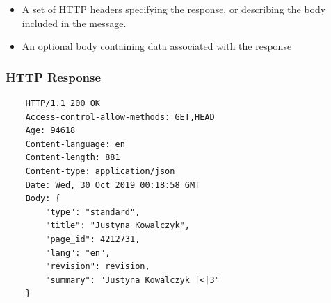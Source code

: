 \documentclass[aspectratio=169]{beamer}
\begin{document}
\begin{frame}
{\begin{itemize}
            \item A set of HTTP headers specifying the response, or describing the body included in the message.
            \item An optional body containing data associated with the response
        \end{itemize}
    }
\end{frame}

\begin{frame}[fragile]
    \frametitle{HTTP Response}
    \begin{verbatim}
    HTTP/1.1 200 OK
    Access-control-allow-methods: GET,HEAD
    Age: 94618
    Content-language: en
    Content-length: 881
    Content-type: application/json
    Date: Wed, 30 Oct 2019 00:18:58 GMT
    Body: {
        "type": "standard",
        "title": "Justyna Kowalczyk",
        "page_id": 4212731,
        "lang": "en",
        "revision": revision,
        "summary": "Justyna Kowalczyk |<|3"
    }
    \end{verbatim}
\end{frame}
\end{document}
